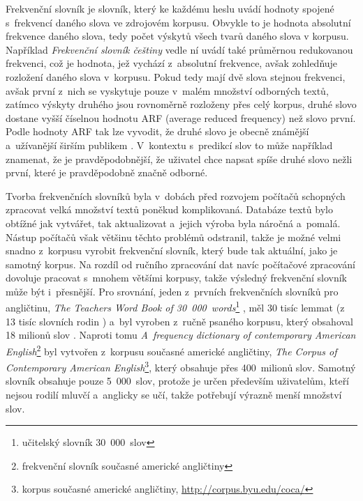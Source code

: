 \documentclass[a4paper,11pt,openany]{book} %
\begin{document}
Frekvenční slovník je slovník, který ke každému heslu uvádí hodnoty spojené s~frekvencí daného slova ve zdrojovém korpusu. Obvykle to je hodnota absolutní frekvence daného slova, tedy počet výskytů všech tvarů daného slova v korpusu. Například {\it Frekvenční slovník češtiny} \parencite{vcermak2004frekvenvcni} %
vedle ní uvádí také průměrnou redukovanou frekvenci, což je hodnota, jež vychází z~absolutní frekvence, avšak zohledňuje rozložení daného slova v~korpusu. Pokud tedy mají dvě slova stejnou frekvenci, avšak první z~nich se vyskytuje pouze v~malém množství odborných textů, zatímco výskyty druhého jsou rovnoměrně rozloženy přes celý korpus, druhé slovo dostane vyšší číselnou hodnotu ARF (average reduced frequency) než slovo první. Podle hodnoty ARF tak lze vyvodit, že druhé slovo je obecně známější a~užívanější širším publikem \parencite{vcermak2004frekvenvcni}. %
V~kontextu s~predikcí slov to může například znamenat, že je pravděpodobnější, že uživatel chce napsat spíše druhé slovo nežli první, které je pravděpodobně značně odborné.


Tvorba frekvenčních slovníků byla v~dobách před rozvojem počítačů schopných zpracovat velká množství textů poněkud komplikovaná. Databáze textů bylo obtížné jak vytvářet, tak aktualizovat a~jejich výroba byla náročná a~pomalá. Nástup počítačů však většinu těchto problémů odstranil, takže je možné velmi snadno z~korpusu vyrobit frekvenční slovník, který bude tak aktuální, jako je samotný korpus. Na rozdíl od ručního zpracování dat navíc počítačové zpracování dovoluje pracovat s~mnohem většími korpusy, takže výsledný frekvenční slovník může být i~přesnější. Pro srovnání, jeden z~prvních frekvenčních slovníků pro angličtinu, {\it The Teachers Word Book of 30~000~words}\footnote{učitelský slovník 30~000~slov} \parencite{lorge1944teacher}, měl 30 tisíc lemmat (z 13 tisíc slovních rodin%
) a~byl vyroben z~ručně psaného korpusu, který obsahoval 18 milionů slov \parencite{nation1997vocabulary}. %
Naproti tomu {\it A~frequency dictionary of contemporary American English}\footnote{frekvenční slovník současné americké angličtiny} \parencite{davies2013frequency} byl vytvořen z~korpusu současné americké angličtiny, {\it The Corpus of Contemporary American English}\footnote{korpus současné americké angličtiny, \url{http://corpus.byu.edu/coca/}}, který obsahuje přes 400~milionů slov. Samotný slovník obsahuje pouze 5~000~slov, protože je určen především uživatelům, kteří nejsou rodilí mluvčí a~anglicky se učí, takže potřebují výrazně menší množství slov.
\end{document}
